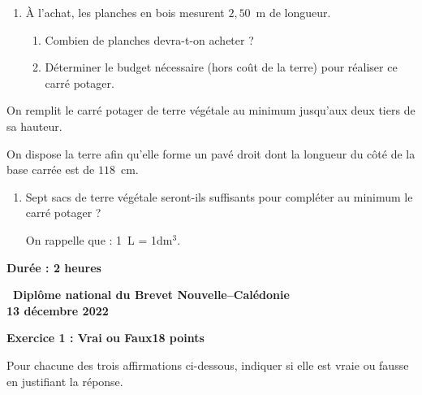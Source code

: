 \documentclass[11pt]{article}
\begin{document}
\smallskip

\begin{enumerate}
\item À l'achat, les planches en bois mesurent $2,50$~m de longueur.
	\begin{enumerate}
		\item Combien de planches devra-t-on acheter ?
		\item Déterminer le budget nécessaire (hors coût de la terre) pour réaliser ce carré potager.
	\end{enumerate}
\end{enumerate}

On remplit le carré potager de terre végétale au minimum jusqu'aux deux tiers de sa hauteur.

On dispose la terre afin qu'elle forme un pavé droit dont la longueur du côté de la base carrée est de $118$~cm.

\begin{enumerate}[resume]
\item Sept sacs de terre végétale seront-ils suffisants pour compléter au minimum le carré potager ?

On rappelle que : 1~L = 1dm$^3$.
\end{enumerate}
\newpage
\hypertarget{Caledoniedec}{}

\label{Caledoniedec}

\pagestyle{fancy}
\thispagestyle{empty}

\begin{center}\textbf{Durée : 2 heures}

\vspace{0,5cm}

{\Large\textbf{\decofourleft~Diplôme national du Brevet
Nouvelle--Calédonie~\decofourright}}\\[7pt]
{\Large \textbf{13 décembre 2022}}
\end{center}

\vspace{0,5cm}

\textbf{Exercice 1 : Vrai ou Faux\hfill 18 points}

\medskip

Pour chacune des trois affirmations ci-dessous, indiquer si elle est vraie ou fausse en justifiant la réponse.
\end{document}
